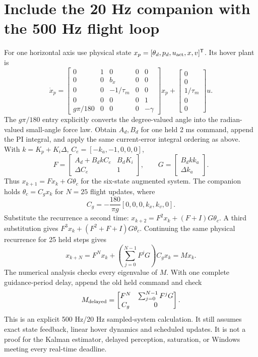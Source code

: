 \section{Include the 20 Hz companion with the 500 Hz flight loop}
For one horizontal axis use physical state
$x_p=[\theta_d,p_d,u_{\rm act},x,v]^{\mathsf T}$. Its hover plant is
\begin{equation}
\dot x_p=\begin{bmatrix}
0&1&0&0&0\\0&0&b_x&0&0\\0&0&-1/\tau_m&0&0\\
0&0&0&0&1\\g\pi/180&0&0&0&-\gamma
\end{bmatrix}x_p+
\begin{bmatrix}0\\0\\1/\tau_m\\0\\0\end{bmatrix}u.
\end{equation}
The $g\pi/180$ entry explicitly converts the degree-valued angle into the
radian-valued small-angle force law. Obtain $A_d,B_d$ for one held 2 ms
command, append the PI integral, and apply the same current-error integral
ordering as above. With $k=K_p+K_i\Delta$, $C_e=[-k_a,-1,0,0,0]$,
\begin{equation}
F=\begin{bmatrix}A_d+B_dkC_e&B_dK_i\\\Delta C_e&1\end{bmatrix},\qquad
G=\begin{bmatrix}B_dkk_a\\\Delta k_a\end{bmatrix}.
\end{equation}
Thus $x_{k+1}=Fx_k+G\theta_c$ for the six-state augmented system.
The companion holds $\theta_c=C_gx_k$ for $N=25$ flight updates, where
\begin{equation}
C_g=-\frac{180}{\pi g}[0,0,0,k_x,k_v,0].
\end{equation}
Substitute the recurrence a second time:
$x_{k+2}=F^2x_k+(F+I)G\theta_c$. A third substitution gives
$F^3x_k+(F^2+F+I)G\theta_c$. Continuing the same physical recurrence for
25 held steps gives
\begin{equation}
x_{k+N}=F^Nx_k+\left(\sum_{j=0}^{N-1}F^jG\right)C_gx_k=Mx_k.
\end{equation}
The numerical analysis checks every eigenvalue of $M$. With one complete
guidance-period delay, append the old held command and check
\begin{equation}
M_{\rm delayed}=\begin{bmatrix}
F^N&\sum_{j=0}^{N-1}F^jG\\C_g&0
\end{bmatrix}.
\end{equation}
This is an explicit 500 Hz/20 Hz sampled-system calculation. It still assumes
exact state feedback, linear hover dynamics and scheduled updates. It is not
a proof for the Kalman estimator, delayed perception, saturation, or Windows
meeting every real-time deadline.

